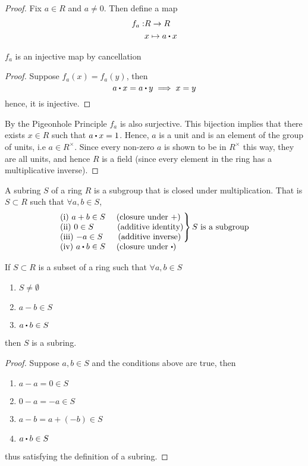 \documentclass[../Main.tex]{subfiles}
\begin{document}
\begin{proof}
	Fix $a\in R$ and $a\ne 0$. Then define a map
	\begin{align*}
		f_a:&R\to R\\
		&x\mapsto a\rdot x
	\end{align*}
	\begin{claim}
		$f_a$ is an injective map by cancellation
	\end{claim}
	\begin{proof}
		Suppose $f_a(x)=f_a(y)$, then
		\[a\rdot x = a\rdot y \implies x=y\]
		hence, it is injective.
	\end{proof}
	By the Pigeonhole Principle $f_a$ is also surjective. This bijection implies that there exists $x\in R$ such that $a\rdot x=1$. Hence, $a$ is a unit and is an element of the group of units, i.e $a\in R^\times$. \newline Since every non-zero $a$ is shown to be in $R^\times$ this way, they are all units, and hence $R$ is a field (since every element in the ring has a multiplicative inverse).
\end{proof}
\begin{dfn}[title=Subring]
	A subring $S$ of a ring $R$ is a subgroup that is closed under multiplication. That is $S\subset R$ such that $\forall a,b \in S$,
	 \[\begin{tabular}{ l }
		$\left.\kern-\nulldelimiterspace
		\begin{tabular}{@{} l @{}}
		(i) $a + b \in S$ \quad (closure under $+$) \\
		(ii) $0 \in S$ \qquad\, (additive identity)                               \\
		(iii) $-a \in S$ \quad\, (additive inverse)
		\end{tabular}\right\} S \text{ is a subgroup}$ \\
		(iv) $a \rdot b \in S$ \quad  (closure under $\rdot$)
	\end{tabular}\]
\end{dfn}
\begin{prop}[title=Subring Criterion]
	If $S\subset R$ is a subset of a ring such that $\forall a,b \in S$ 
	\begin{enumerate}
		\item $S \ne \emptyset$
		\item $a-b \in S$
		\item $a\rdot b \in S$
	\end{enumerate}
	then $S$ is a subring.
\end{prop}
\begin{proof}
	Suppose $a,b\in S$ and the conditions above are true, then
	\begin{enumerate}
		\item $a-a=0\in S$
		\item $0-a=-a\in S$
		\item $a-b = a+(-b) \in S$
		\item $a\rdot b \in S$
	\end{enumerate}
	thus satisfying the definition of a subring.
\end{proof}
\end{document}
